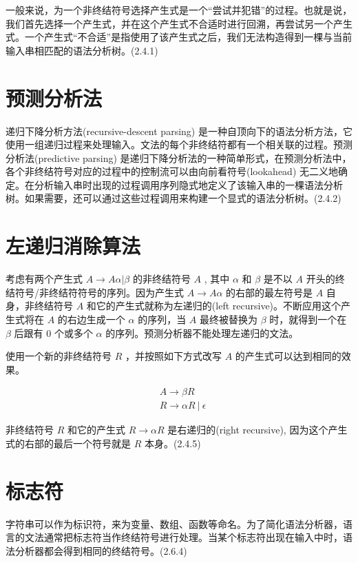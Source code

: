 一般来说，为一个非终结符号选择产生式是一个“尝试并犯错”的过程。也就是说，我们首先选择一个产生式，并在这个产生式不合适时进行回溯，再尝试另一个产生式。一个产生式“不合适”是指使用了该产生式之后，我们无法构造得到一棵与当前输入串相匹配的语法分析树。(2.4.1)


\section*{预测分析法}

递归下降分析方法(recursive-descent parsing) 是一种自顶向下的语法分析方法，它使用一组递归过程来处理输入。文法的每个非终结符都有一个相关联的过程。预测分析法(predictive parsing) 是递归下降分析法的一种简单形式，在预测分析法中，各个非终结符号对应的过程中的控制流可以由向前看符号(lookahead) 无二义地确定。在分析输入串时出现的过程调用序列隐式地定义了该输入串的一棵语法分析树。如果需要，还可以通过这些过程调用来构建一个显式的语法分析树。(2.4.2)


\section*{左递归消除算法}

考虑有两个产生式 $A \rightarrow A \alpha | \beta$ 的非终结符号 $A$ , 其中 $\alpha$ 和 $\beta$ 是不以 $A$ 开头的终结符号/非终结符符号的序列。因为产生式 $A \rightarrow A\alpha$ 的右部的最左符号是 $A$ 自身，非终结符号 $A$ 和它的产生式就称为左递归的(left recursive)。不断应用这个产生式将在 $A$ 的右边生成一个 $\alpha$ 的序列，当 $A$ 最终被替换为 $\beta$ 时，就得到一个在 $\beta$ 后跟有 0 个或多个 $\alpha$ 的序列。预测分析器不能处理左递归的文法。

使用一个新的非终结符号 $R$ ，并按照如下方式改写 $A$ 的产生式可以达到相同的效果。

\begin{align}
& A \rightarrow \beta R \nonumber \\
& R \rightarrow \alpha R\ |\ \epsilon \nonumber
\end{align}

非终结符号 $R$ 和它的产生式 $R \rightarrow \alpha R$ 是右递归的(right recursive), 因为这个产生式的右部的最后一个符号就是 $R$ 本身。(2.4.5)

\section*{标志符}

字符串可以作为标识符，来为变量、数组、函数等命名。为了简化语法分析器，语言的文法通常把标志符当作终结符号进行处理。当某个标志符出现在输入中时，语法分析器都会得到相同的终结符号。(2.6.4)

